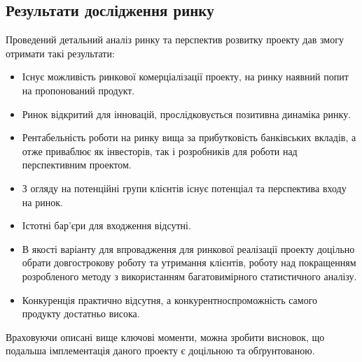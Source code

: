 \newpage
\subsection{Результати дослідження ринку}
Проведений детальний аналіз ринку та перспектив розвитку проекту дав змогу отримати такі результати:
\begin{itemize}  
	\item Існує можливість ринкової комерціалізації проекту, на ринку наявний попит на пропонований продукт.
	\item Ринок відкритий для інновацій, прослідковується позитивна динаміка ринку. 
	\item Рентабельність роботи на ринку вища за прибутковість банківських вкладів, а отже приваблює як інвесторів, так і розробників для роботи над перспективним проектом. 
	\item З огляду на потенційні групи клієнтів існує потенціал та перспектива входу на ринок. 
	\item Істотні бар'єри для входження відсутні.
	\item В якості варіанту для впровадження для ринкової реалізації проекту доцільно обрати довгострокову роботу та утримання клієнтів, роботу над покращенням розробленого методу з використанням багатовимірного статистичного аналізу.
	\item Конкуренція практично відсутня, а конкурентноспроможність самого продукту достатньо висока.
\end{itemize}
Враховуючи описані вище ключові моменти, можна зробити висновок, що подальша імплементація даного проекту є доцільною та обґрунтованою.
